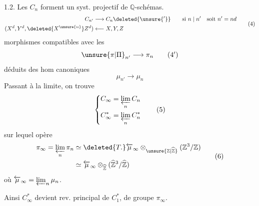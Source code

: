 1.2. Les $C_n$ forment un syst. projectif de $\mathbb Q$-schémas.
\[
\begin{aligned}
C_{n'}&\longrightarrow C_n\deleted{\unsure{'}}\qquad\text{si }n\mid n'\quad\text{soit }n'=nd\\
(X^d,Y^d,\deleted{X^{\unsure{n}}}Z^d)&\longleftarrow X,Y,Z
\end{aligned}\tag*{(4)}
\]
morphismes compatibles avec les
\[
\unsure{\pi|\Pi}_{n'}\longrightarrow\pi_n\tag*{($4'$)}
\]
déduits des hom canoniques
\[
\mu_{n'}\longrightarrow\mu_n\tag*{($4''$)}
\]
Passant à la limite, on trouve
\[
\left\{\begin{aligned}
C_\infty&=\varprojlim_n C_n\\
C_\infty^*&=\varprojlim_n C_n^*
\end{aligned}\right.\tag*{(5)}
\]
sur lequel opère
\[
\begin{aligned}
\pi_\infty=\varprojlim_n\pi_n&\simeq\deleted{T\mathbin{.}}
\overleftarrow{\mu}_\infty\otimes_{\unsure{\mathbb Z|\widehat{\mathbb Z}}}
(\mathbb Z^3/\mathbb Z)\\
&\simeq\overleftarrow{\mu}_\infty\otimes_{\widehat{\mathbb Z}}
(\widehat{\mathbb Z}^3/\widehat{\mathbb Z})
\end{aligned}\tag*{(6)}
\]
où $\overleftarrow{\mu}_\infty=\varprojlim_n\mu_n$.

Ainsi $C_\infty^*$ devient rev. principal de $C_1^*$,
de groupe $\pi_\infty$.
